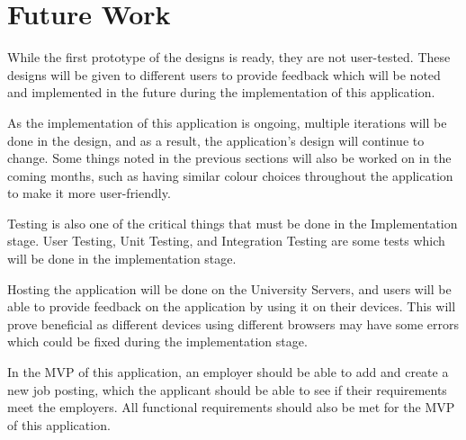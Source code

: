 \newpage
\section{Future Work}
While the first prototype of the designs is ready, they are not user-tested. These designs will be given to different users to provide feedback which will be noted and implemented in the future during the implementation of this application. 

As the implementation of this application is ongoing, multiple iterations will be done in the design, and as a result, the application's design will continue to change. Some things noted in the previous sections will also be worked on in the coming months, such as having similar colour choices throughout the application to make it more user-friendly. 

Testing is also one of the critical things that must be done in the Implementation stage. User Testing, Unit Testing, and Integration Testing are some tests which will be done in the implementation stage. 

Hosting the application will be done on the University Servers, and users will be able to provide feedback on the application by using it on their devices. This will prove beneficial as different devices using different browsers may have some errors which could be fixed during the implementation stage. 

In the MVP of this application, an employer should be able to add and create a new job posting, which the applicant should be able to see if their requirements meet the employers. All functional requirements should also be met for the MVP of this application.